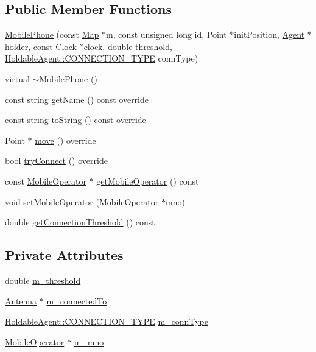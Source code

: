 \subsection*{Public Member Functions}
\begin{DoxyCompactItemize}
\item 
\hyperlink{class_mobile_phone_afd7beed70eb2af3baecd9521332ba8eb}{Mobile\+Phone} (const \hyperlink{class_map}{Map} $\ast$m, const unsigned long id, Point $\ast$init\+Position, \hyperlink{class_agent}{Agent} $\ast$holder, const \hyperlink{class_clock}{Clock} $\ast$clock, double threshold, \hyperlink{class_holdable_agent_ae2c334b004d7b9c5a999cf2618e4e518}{Holdable\+Agent\+::\+C\+O\+N\+N\+E\+C\+T\+I\+O\+N\+\_\+\+T\+Y\+PE} conn\+Type)
\item 
virtual \hyperlink{class_mobile_phone_a51db1d9b4fcc52ea9f8d613dae4f6a4b}{$\sim$\+Mobile\+Phone} ()
\item 
const string \hyperlink{class_mobile_phone_a1eeac3141baafa75ebcf26fc3a0e4068}{get\+Name} () const override
\item 
const string \hyperlink{class_mobile_phone_a2b7e556d12a43e380786ad0eccf3ce04}{to\+String} () const override
\item 
Point $\ast$ \hyperlink{class_mobile_phone_a785d0cac08252386603c702ad8f38c5b}{move} () override
\item 
bool \hyperlink{class_mobile_phone_ad91afa811cea8ee124167f5941bcda1b}{try\+Connect} () override
\item 
const \hyperlink{class_mobile_operator}{Mobile\+Operator} $\ast$ \hyperlink{class_mobile_phone_aba72025d08c382d8533e0cbb9166999b}{get\+Mobile\+Operator} () const
\item 
void \hyperlink{class_mobile_phone_ad4db8203e8f2e974733357d7c3e6cf28}{set\+Mobile\+Operator} (\hyperlink{class_mobile_operator}{Mobile\+Operator} $\ast$mno)
\item 
double \hyperlink{class_mobile_phone_a57475711a8f85086f50067d219f1181d}{get\+Connection\+Threshold} () const
\end{DoxyCompactItemize}
\subsection*{Private Attributes}
\begin{DoxyCompactItemize}
\item 
double \hyperlink{class_mobile_phone_afb6364675f7cf6e09856f49ae6c10563}{m\+\_\+threshold}
\item 
\hyperlink{class_antenna}{Antenna} $\ast$ \hyperlink{class_mobile_phone_aa143b94346485788c3563228f6043721}{m\+\_\+connected\+To}
\item 
\hyperlink{class_holdable_agent_ae2c334b004d7b9c5a999cf2618e4e518}{Holdable\+Agent\+::\+C\+O\+N\+N\+E\+C\+T\+I\+O\+N\+\_\+\+T\+Y\+PE} \hyperlink{class_mobile_phone_a39f69fef45f380e3922dfe78b904372d}{m\+\_\+conn\+Type}
\item 
\hyperlink{class_mobile_operator}{Mobile\+Operator} $\ast$ \hyperlink{class_mobile_phone_a1b26abc840ac8f8679dd62939330c597}{m\+\_\+mno}
\end{DoxyCompactItemize}

